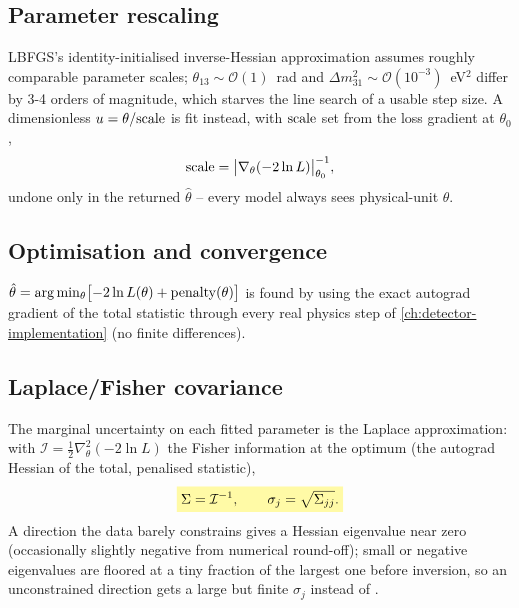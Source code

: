 \begin{theorybox}
\subsection*{Parameter rescaling}
LBFGS's identity-initialised inverse-Hessian approximation assumes roughly
comparable parameter scales; $\theta_{13}\sim\mathcal O(1)$~rad and
$\Delta m^2_{31}\sim\mathcal O(10^{-3})$~eV$^2$ differ by 3-4 orders of
magnitude, which starves the line search of a usable step size. A
dimensionless $u=\theta/{\rm scale}$ is fit instead, with ${\rm scale}$ set
from the loss gradient at $\theta_0$,
\begin{equation}
  {\rm scale} = \bigl|\nabla_\theta(-2\ln L)\bigr|_{\theta_0}^{-1},
\end{equation}
undone only in the returned $\hat\theta$ -- every model always sees
physical-unit $\theta$.

\subsection*{Optimisation and convergence}
$\hat\theta=\arg\min_\theta\bigl[-2\ln L(\theta) + {\rm penalty}(\theta)\bigr]$
is found by  using the exact autograd gradient of
the total statistic through every real physics step of
\cref{ch:detector-implementation} (no finite differences).

\subsection*{Laplace/Fisher covariance}
The marginal uncertainty on each fitted parameter is the Laplace
approximation: with $\mathcal I=\tfrac12\nabla^2_\theta(-2\ln L)$ the
Fisher information at the optimum (the autograd Hessian of the total,
penalised statistic),
\begin{equation}
  \keyresult{\Sigma = \mathcal I^{-1}, \qquad \sigma_j = \sqrt{\Sigma_{jj}}.}
  \label{eq:laplace-covariance}
\end{equation}
A direction the data barely constrains gives a Hessian eigenvalue near
zero (occasionally slightly negative from numerical round-off); small or
negative eigenvalues are floored at a tiny fraction of the largest one
before inversion, so an unconstrained direction gets a large but finite
$\sigma_j$ instead of .
\end{theorybox}

